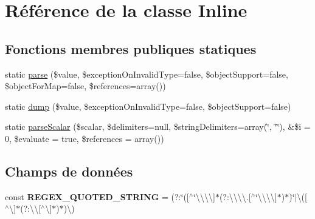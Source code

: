 \hypertarget{class_symfony_1_1_component_1_1_yaml_1_1_inline}{}\section{Référence de la classe Inline}
\label{class_symfony_1_1_component_1_1_yaml_1_1_inline}
\subsection*{Fonctions membres publiques statiques}
\begin{DoxyCompactItemize}
\item 
static \hyperlink{class_symfony_1_1_component_1_1_yaml_1_1_inline_aac3e77ad561ffe26c7132a0d43916231}{parse} (\$value, \$exception\+On\+Invalid\+Type=false, \$object\+Support=false, \$object\+For\+Map=false, \$references=array())
\item 
static \hyperlink{class_symfony_1_1_component_1_1_yaml_1_1_inline_abf44b3703d42f0fe1c0c292cf46822f6}{dump} (\$value, \$exception\+On\+Invalid\+Type=false, \$object\+Support=false)
\item 
static \hyperlink{class_symfony_1_1_component_1_1_yaml_1_1_inline_a17c1b4efbb0fe81775bc23fb7ad381de}{parse\+Scalar} (\$scalar, \$delimiters=null, \$string\+Delimiters=array(\textquotesingle{}\char`\"{}\textquotesingle{}, \char`\"{}\textquotesingle{}\char`\"{}), \&\$i = 0, \$evaluate = true, \$references = array()) 
\end{DoxyCompactItemize}
\subsection*{Champs de données}
\begin{DoxyCompactItemize}
\item 
const {\bfseries R\+E\+G\+E\+X\+\_\+\+Q\+U\+O\+T\+E\+D\+\_\+\+S\+T\+R\+I\+NG} = \textquotesingle{}(?\+:\char`\"{}(\mbox{[}$^\wedge$\char`\"{}\textbackslash{}\textbackslash{}\textbackslash{}\textbackslash{}\mbox{]}$\ast$(?\+:\textbackslash{}\textbackslash{}\textbackslash{}\textbackslash{}.\mbox{[}$^\wedge$\char`\"{}\textbackslash{}\textbackslash{}\textbackslash{}\textbackslash{}\mbox{]}$\ast$)$\ast$)\char`\"{}$\vert$\textbackslash{}\textquotesingle{}(\mbox{[}$^\wedge$\textbackslash{}\textquotesingle{}\mbox{]}$\ast$(?\+:\textbackslash{}\textquotesingle{}\textbackslash{}\textquotesingle{}\mbox{[}$^\wedge$\textbackslash{}\textquotesingle{}\mbox{]}$\ast$)$\ast$)\textbackslash{}\textquotesingle{})\textquotesingle{}\hypertarget{class_symfony_1_1_component_1_1_yaml_1_1_inline_a87b5c4996630ab02b80f5abece2c2fe0}{}\label{class_symfony_1_1_component_1_1_yaml_1_1_inline_a87b5c4996630ab02b80f5abece2c2fe0}

\end{DoxyCompactItemize}


